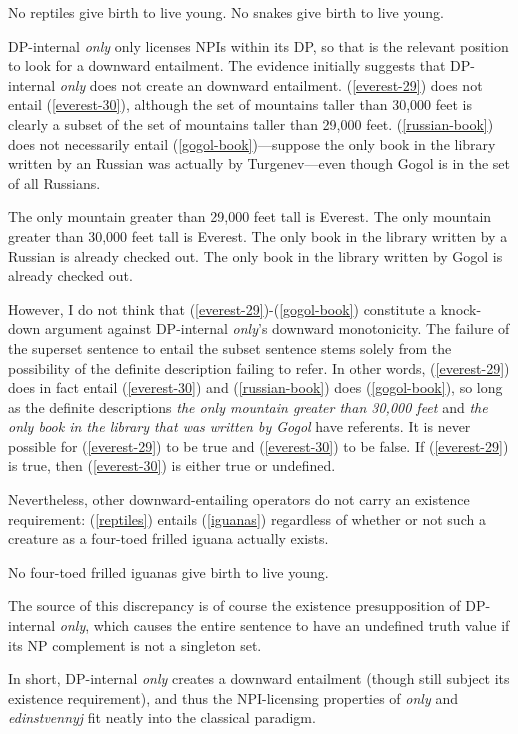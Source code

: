 \begin{exe}
	\ex \label{reptiles} No reptiles give birth to live young.
	\ex \label{snakes} No snakes give birth to live young.
\end{exe}

DP-internal \textit{only} only licenses NPIs within its DP, so that is the relevant position to look for a downward entailment. The evidence initially suggests that DP-internal \textit{only} does not create an downward entailment. (\ref{everest-29}) does not entail (\ref{everest-30}), although the set of mountains taller than 30,000 feet is clearly a subset of the set of mountains taller than 29,000 feet. (\ref{russian-book}) does not necessarily entail (\ref{gogol-book})---suppose the only book in the library written by an Russian was actually by Turgenev---even though Gogol is in the set of all Russians.

\begin{exe}
	\ex \label{everest-29} The only mountain greater than 29,000 feet tall is Everest.
	\ex \label{everest-30} The only mountain greater than 30,000 feet tall is Everest.
	\ex \label{russian-book} The only book in the library written by a Russian is already checked out.
	\ex \label{gogol-book} The only book in the library written by Gogol is already checked out.
\end{exe}

However, I do not think that (\ref{everest-29})-(\ref{gogol-book}) constitute a knock-down argument against DP-internal \textit{only}'s downward monotonicity. The failure of the superset sentence to entail the subset sentence stems solely from the possibility of the definite description failing to refer. In other words, (\ref{everest-29}) does in fact entail (\ref{everest-30}) and (\ref{russian-book}) does (\ref{gogol-book}), so long as the definite descriptions \textit{the only mountain greater than 30,000 feet} and \textit{the only book in the library that was written by Gogol} have referents. It is never possible for (\ref{everest-29}) to be true and (\ref{everest-30}) to be false. If (\ref{everest-29}) is true, then (\ref{everest-30}) is either true or undefined.

Nevertheless, other downward-entailing operators do not carry an existence requirement: (\ref{reptiles}) entails (\ref{iguanas}) regardless of whether or not such a creature as a four-toed frilled iguana actually exists.

\begin{exe}
	\ex \label{iguanas} No four-toed frilled iguanas give birth to live young.
\end{exe}

The source of this discrepancy is of course the existence presupposition of DP-internal \textit{only}, which causes the entire sentence to have an undefined truth value if its NP complement is not a singleton set.

In short, DP-internal \textit{only} creates a downward entailment (though still subject its existence requirement), and thus the NPI-licensing properties of \textit{only} and \textit{edinstvennyj} fit neatly into the classical paradigm.